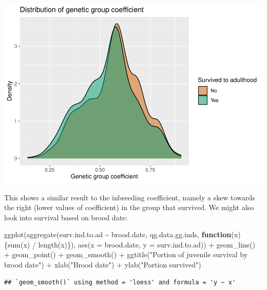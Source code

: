 \documentclass[
]{article}
\newenvironment{Shaded}{\begin{snugshade}}{\end{snugshade}}
\newcommand{\AttributeTok}[1]{\textcolor[rgb]{0.77,0.63,0.00}{#1}}
\newcommand{\ControlFlowTok}[1]{\textcolor[rgb]{0.13,0.29,0.53}{\textbf{#1}}}
\newcommand{\FunctionTok}[1]{\textcolor[rgb]{0.00,0.00,0.00}{#1}}
\newcommand{\NormalTok}[1]{#1}
\newcommand{\SpecialCharTok}[1]{\textcolor[rgb]{0.00,0.00,0.00}{#1}}
\newcommand{\StringTok}[1]{\textcolor[rgb]{0.31,0.60,0.02}{#1}}
\begin{document}
\includegraphics{EDA_files/figure-latex/unnamed-chunk-10-1.pdf}

This shows a similar result to the inbreeding coefficient, namely a skew
towards the right (lower values of coefficient) in the group that
survived. We might also look into survival based on brood date:

\begin{Shaded}
\begin{Highlighting}[]
\FunctionTok{ggplot}\NormalTok{(}\FunctionTok{aggregate}\NormalTok{(surv.ind.to.ad }\SpecialCharTok{\textasciitilde{}}\NormalTok{ brood.date, qg.data.gg.inds,}
                 \ControlFlowTok{function}\NormalTok{(x) \{}\FunctionTok{sum}\NormalTok{(x) }\SpecialCharTok{/} \FunctionTok{length}\NormalTok{(x)\}),}
  \FunctionTok{aes}\NormalTok{(}\AttributeTok{x =}\NormalTok{ brood.date, }\AttributeTok{y =}\NormalTok{ surv.ind.to.ad)) }\SpecialCharTok{+}
  \FunctionTok{geom\_line}\NormalTok{() }\SpecialCharTok{+}
  \FunctionTok{geom\_point}\NormalTok{() }\SpecialCharTok{+}
  \FunctionTok{geom\_smooth}\NormalTok{() }\SpecialCharTok{+}
  \FunctionTok{ggtitle}\NormalTok{(}\StringTok{"Portion of juvenile survival by brood date"}\NormalTok{) }\SpecialCharTok{+}
  \FunctionTok{xlab}\NormalTok{(}\StringTok{"Brood date"}\NormalTok{) }\SpecialCharTok{+}
  \FunctionTok{ylab}\NormalTok{(}\StringTok{"Portion survived"}\NormalTok{)}
\end{Highlighting}
\end{Shaded}

\begin{verbatim}
## `geom_smooth()` using method = 'loess' and formula = 'y ~ x'
\end{verbatim}
\end{document}
